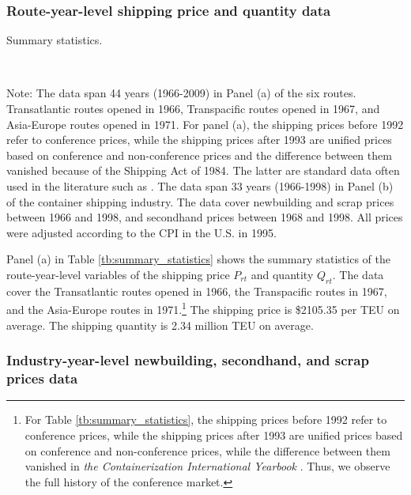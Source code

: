 \documentclass[11pt]{article}
\begin{document}
\subsubsection{Route-year-level shipping price and quantity data}

\begin{table}[!htbp]
  \begin{center}
      \caption{Summary statistics.}
      \label{tb:summary_statistics} 
      \\
  \end{center}\footnotesize
  Note: The data span 44 years (1966-2009) in Panel (a) of the six routes. Transatlantic routes opened in 1966, Transpacific routes opened in 1967, and Asia-Europe routes opened in 1971. For panel (a), the shipping prices before 1992 refer to conference prices, while the shipping prices after 1993 are unified prices based on conference and non-conference prices and the difference between them vanished because of the Shipping Act of 1984. The latter are standard data often used in the literature such as \cite{jeon2022learning}. The data span 33 years (1966-1998) in Panel (b) of the container shipping industry. The data cover newbuilding and scrap prices between 1966 and 1998, and secondhand prices between 1968 and 1998. All prices were adjusted according to the CPI in the U.S. in 1995. 
\end{table} 

Panel (a) in Table \ref{tb:summary_statistics} shows the summary statistics of the route-year-level variables of the shipping price $P_{rt}$ and quantity $Q_{rt}$. The data cover the Transatlantic routes opened in 1966, the Transpacific routes in 1967, and the Asia-Europe routes in 1971.\footnote{For Table \ref{tb:summary_statistics}, the shipping prices before 1992 refer to conference prices, while the shipping prices after 1993 are unified prices based on conference and non-conference prices, while the difference between them vanished in \textit{the Containerization International Yearbook} . Thus, we observe the full history of the conference market.} The shipping price is \$2105.35 per TEU on average. The shipping quantity is 2.34 million TEU on average. 

\subsubsection{Industry-year-level newbuilding, secondhand, and scrap prices data}
\end{document}
